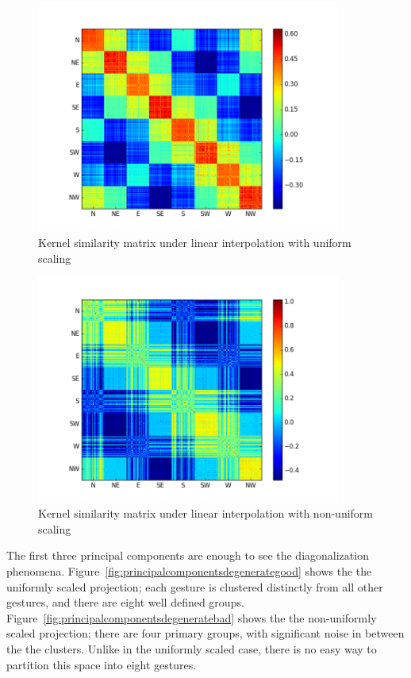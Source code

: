 \documentclass[12pt,journal,compsoc]{IEEEtran}
\begin{document}
\begin{figure}[tbp]
	\centering
	\includegraphics[trim={2cm 0 1cm 0},clip,width=10cm]{KernelSimilarityMatrixDegenerateGood}
	\caption{Kernel similarity matrix under linear interpolation with uniform scaling}
    \label{fig:kernelsimilaritymatrixdegenerategood}
\end{figure}

\begin{figure}[tbp]
	\centering
	\includegraphics[trim={2cm 0 1cm 0},clip,width=10cm]{KernelSimilarityMatrixDegenerateBad}
	\caption{Kernel similarity matrix under linear interpolation with non-uniform scaling}
    \label{fig:kernelsimilaritymatrixdegeneratebad}
\end{figure}

The first three principal components are enough to see the diagonalization phenomena.
Figure~\ref{fig:principalcomponentsdegenerategood} shows the the uniformly scaled projection;
each gesture is clustered distinctly from all other gestures, and there are eight well defined groups.
Figure~\ref{fig:principalcomponentsdegeneratebad} shows the the non-uniformly scaled projection;
there are four primary groups, with significant noise in between the the clusters. Unlike in the 
uniformly scaled case, there is no easy way to partition this space into eight gestures.
\end{document}
